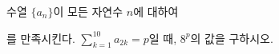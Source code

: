 \hspace*{2mm}\begin{minipage}[t]{\dimexpr\linewidth-2mm\relax}\vspace{0pt}
수열 $\{a_n\}$이 모든 자연수 $n$에 대하여 \par\smallskip{}\par\smallskip\noindent 를 만족시킨다. $\displaystyle\sum_{k=1}^{10}a_{2k}=p$일 때, $8^p$의 값을 구하시오.\end{minipage}
